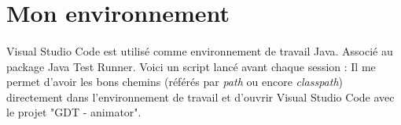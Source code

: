 \section{Mon environnement}
\paragraph{}
Visual Studio Code est utilisé comme environnement de travail Java. Associé au package Java Test Runner.
Voici un script lancé avant chaque session :
Il me permet d'avoir les bons chemins (référés par \textit{path} ou encore \textit{classpath}) directement dans l'environnement de travail et d'ouvrir Visual Studio Code avec le projet "GDT - animator".